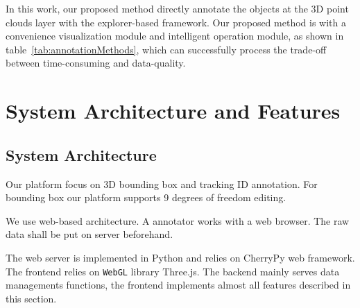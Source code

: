 \documentclass[letterpaper, 10 pt, conference]{ieeeconf}  %
\begin{document}
In this work, our proposed method directly annotate the objects at the 3D point clouds layer with the explorer-based framework. Our proposed method is with a convenience visualization module and intelligent operation module, as shown in table~\ref{tab:annotationMethods}, which can successfully process the trade-off between time-consuming and data-quality.

\section{System Architecture and Features}

\subsection{System Architecture}
Our platform focus on 3D bounding box and tracking ID annotation. For bounding box our platform supports 9 degrees of freedom editing. 

We use web-based architecture. A annotator works with a web browser. The raw data shall be put on server beforehand. 

The web server is implemented in Python and relies on CherryPy\cite{cherrypy} web framework. The frontend relies on \texttt{WebGL} library Three.js\cite{threejs}. The backend mainly serves data managements functions, the frontend implements almost all features described in this section.

\end{document}

